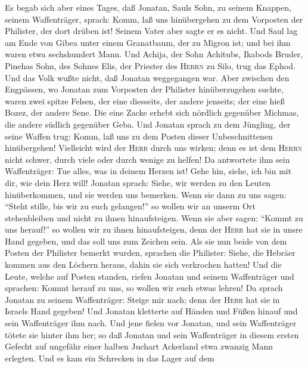  Es begab sich aber eines Tages, daß Jonatan, Sauls Sohn,
zu seinem Knappen, seinem Waffenträger, sprach: Komm, laß uns
hinübergehen zu dem Vorposten der Philister, der dort drüben ist! Seinem
Vater aber sagte er es nicht.  Und Saul lag am Ende von
Gibea unter einem Granatbaum, der zu Migron ist; und bei ihm waren etwa
sechshundert Mann.  Und Achija, der Sohn Achitubs, Ikabods
Bruder, Pinehas\textquotesingle{} Sohn, des Sohnes Elis, der Priester
des \textsc{Herrn} zu Silo, trug das Ephod. Und das Volk wußte nicht,
daß Jonatan weggegangen war.  Aber zwischen den Engpässen,
wo Jonatan zum Vorposten der Philister hinüberzugehen suchte, waren zwei
spitze Felsen, der eine diesseits, der andere jenseits; der eine hieß
Bozez, der andere Sene.  Die eine Zacke erhebt sich
nördlich gegenüber Michmas, die andere südlich gegenüber Geba.
 Und Jonatan sprach zu dem Jüngling, der seine Waffen
trug: Komm, laß uns zu dem Posten dieser Unbeschnittenen hinübergehen!
Vielleicht wird der \textsc{Herr} durch uns wirken; denn es ist dem
\textsc{Herrn} nicht schwer, durch viele oder durch wenige zu helfen!
 Da antwortete ihm sein Waffenträger: Tue alles, was in
deinem Herzen ist! Gehe hin, siehe, ich bin mit dir, wie dein Herz will!
 Jonatan sprach: Siehe, wir werden zu den Leuten
hinüberkommen, und sie werden uns bemerken.  Wenn sie dann
zu uns sagen: ``Steht stille, bis wir zu euch gelangen!'' so wollen wir
an unserm Ort stehenbleiben und nicht zu ihnen hinaufsteigen.
 Wenn sie aber sagen: ``Kommt zu uns herauf!'' so wollen
wir zu ihnen hinaufsteigen, denn der \textsc{Herr} hat sie in unsre Hand
gegeben, und das soll uns zum Zeichen sein.  Als sie nun
beide von dem Posten der Philister bemerkt wurden, sprachen die
Philister: Siehe, die Hebräer kommen aus den Löchern heraus, dahin sie
sich verkrochen hatten!  Und die Leute, welche auf Posten
standen, riefen Jonatan und seinem Waffenträger und sprachen: Kommt
herauf zu uns, so wollen wir euch etwas lehren! Da sprach Jonatan zu
seinem Waffenträger: Steige mir nach; denn der \textsc{Herr} hat sie in
Israels Hand gegeben!  Und Jonatan kletterte auf Händen
und Füßen hinauf und sein Waffenträger ihm nach. Und jene fielen vor
Jonatan, und sein Waffenträger tötete sie hinter ihm her;
 so daß Jonatan und sein Waffenträger in diesem ersten
Gefecht auf ungefähr einer halben Juchart Ackerland etwa zwanzig Mann
erlegten.  Und es kam ein Schrecken in das Lager auf dem
